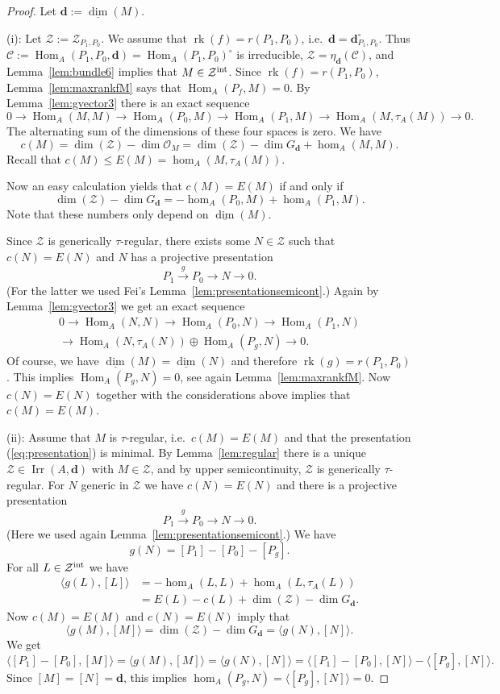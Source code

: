 \documentclass[12pt,reqno]{amsart}
\theoremstyle{definition}
\newcommand{\cC}{{\mathcal C}}
\newcommand{\cO}{{\mathcal O}}
\newcommand{\bd}{\mathbf{d}}
\newcommand{\rk}{\operatorname{rk}}
\newcommand{\dimv}{\underline{\dim}}
\newcommand{\Hom}{\operatorname{Hom}}
\newcommand{\bil}[1]{\langle #1\rangle}
\newcommand{\irr}{\operatorname{Irr}}
\newcommand{\calZ}{\mathcal{Z}}
\begin{document}
\begin{proof}
Let $\bd := \dimv(M)$.

(i):
Let $\calZ := \calZ_{P_1,P_0}$.
We assume that $\rk(f) = r(P_1,P_0)$,
i.e.\ $\bd = \bd_{P_1,P_0}^\circ$.
Thus $\cC := \Hom_A(P_1,P_0,\bd) = \Hom_A(P_1,P_0)^\circ$ is irreducible,
$\calZ = \eta_\bd(\cC)$,
and Lemma~\ref{lem:bundle6} implies that
$M \in \calZ^{\rm int}$.
Since $\rk(f) = r(P_1,P_0)$, Lemma~\ref{lem:maxrankfM}
says that $\Hom_A(P_f,M) = 0$.
By Lemma~\ref{lem:gvector3}
there is an exact sequence
$$
0 \to \Hom_A(M,M) \to \Hom_A(P_0,M) \to \Hom_A(P_1,M)
\to \Hom_A(M,\tau_A(M)) \to 0.
$$
The alternating sum of the dimensions of these
four spaces is zero.
We have
$$
c(M) = \dim(\calZ) - \dim \cO_M = \dim(\calZ) - \dim G_\bd + \hom_A(M,M).
$$
Recall that $c(M) \le E(M) = \hom_A(M,\tau_A(M))$.

Now an easy calculation yields that
$c(M) = E(M)$ if and only if
$$
\dim(\calZ) - \dim G_\bd = -\hom_A(P_0,M) + \hom_A(P_1,M).
$$
Note that
these numbers only depend on $\dimv(M)$.

Since $\calZ$ is generically $\tau$-regular, there exists some
$N \in \calZ$ such that $c(N) = E(N)$ and $N$ has
a projective presentation
$$
P_1 \xrightarrow{g} P_0 \to N \to 0.
$$
(For the latter we used Fei's Lemma~\ref{lem:presentationsemicont}.)
Again by Lemma~\ref{lem:gvector3}
we get an exact sequence
\begin{multline*}
0 \to \Hom_A(N,N) \to \Hom_A(P_0,N) \to \Hom_A(P_1,N)
\\
\to \Hom_A(N,\tau_A(N)) \oplus \Hom_A(P_g,N) \to 0.
\end{multline*}
Of course, we have $\dimv(M) = \dimv(N)$ and therefore
$\rk(g) = r(P_1,P_0)$.
This implies $\Hom_A(P_g,N) = 0$, see again Lemma~\ref{lem:maxrankfM}.
Now $c(N) = E(N)$ together with the considerations above implies that
$c(M) = E(M)$.


(ii):
Assume that $M$ is $\tau$-regular, i.e.\ $c(M) = E(M)$
and that the presentation (\ref{eq:presentation}) is minimal.
By Lemma~\ref{lem:regular}
there is a unique $\calZ \in \irr(A,\bd)$ with $M \in \calZ$, and by
upper semicontinuity, $\calZ$ is generically $\tau$-regular.
For $N$ generic in $\calZ$ we have $c(N) = E(N)$ and there is a projective presentation
$$
P_1 \xrightarrow{g} P_0 \to N \to 0.
$$
(Here we used again Lemma~\ref{lem:presentationsemicont}.)
We have
$$
g(N) = [P_1] - [P_0] - [P_g].
$$
For all $L \in \calZ^{\rm int}$ we have
\begin{align*}
\bil{g(L),[L]} &= - \hom_A(L,L) + \hom_A(L,\tau_A(L))
\\
&= E(L) - c(L) + \dim(\calZ) - \dim G_\bd.
\end{align*}
Now $c(M) = E(M)$ and $c(N) = E(N)$ imply that
$$
\bil{g(M),[M]} = \dim(\calZ) - \dim G_\bd = \bil{g(N),[N]}.
$$
We get
$$
\bil{[P_1]-[P_0],[M]} = \bil{g(M),[M]} = \bil{g(N),[N]} =
\bil{[P_1]-[P_0],[N]} - \bil{[P_g],[N]}.
$$
Since $[M] = [N] = \bd$, this
implies $\hom_A(P_g,N) = \bil{[P_g],[N]} = 0$.


\end{proof}
\end{document}
